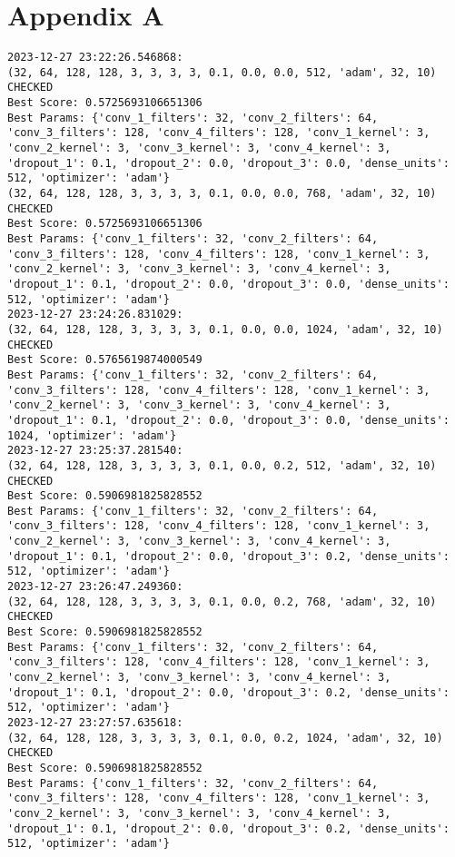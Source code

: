 \section*{Appendix A}
\begin{verbatim}
2023-12-27 23:22:26.546868:
(32, 64, 128, 128, 3, 3, 3, 3, 0.1, 0.0, 0.0, 512, 'adam', 32, 10) CHECKED
Best Score: 0.5725693106651306
Best Params: {'conv_1_filters': 32, 'conv_2_filters': 64, 'conv_3_filters': 128, 'conv_4_filters': 128, 'conv_1_kernel': 3, 'conv_2_kernel': 3, 'conv_3_kernel': 3, 'conv_4_kernel': 3, 'dropout_1': 0.1, 'dropout_2': 0.0, 'dropout_3': 0.0, 'dense_units': 512, 'optimizer': 'adam'}
(32, 64, 128, 128, 3, 3, 3, 3, 0.1, 0.0, 0.0, 768, 'adam', 32, 10) CHECKED
Best Score: 0.5725693106651306
Best Params: {'conv_1_filters': 32, 'conv_2_filters': 64, 'conv_3_filters': 128, 'conv_4_filters': 128, 'conv_1_kernel': 3, 'conv_2_kernel': 3, 'conv_3_kernel': 3, 'conv_4_kernel': 3, 'dropout_1': 0.1, 'dropout_2': 0.0, 'dropout_3': 0.0, 'dense_units': 512, 'optimizer': 'adam'}
2023-12-27 23:24:26.831029:
(32, 64, 128, 128, 3, 3, 3, 3, 0.1, 0.0, 0.0, 1024, 'adam', 32, 10) CHECKED
Best Score: 0.5765619874000549
Best Params: {'conv_1_filters': 32, 'conv_2_filters': 64, 'conv_3_filters': 128, 'conv_4_filters': 128, 'conv_1_kernel': 3, 'conv_2_kernel': 3, 'conv_3_kernel': 3, 'conv_4_kernel': 3, 'dropout_1': 0.1, 'dropout_2': 0.0, 'dropout_3': 0.0, 'dense_units': 1024, 'optimizer': 'adam'}
2023-12-27 23:25:37.281540:
(32, 64, 128, 128, 3, 3, 3, 3, 0.1, 0.0, 0.2, 512, 'adam', 32, 10) CHECKED
Best Score: 0.5906981825828552
Best Params: {'conv_1_filters': 32, 'conv_2_filters': 64, 'conv_3_filters': 128, 'conv_4_filters': 128, 'conv_1_kernel': 3, 'conv_2_kernel': 3, 'conv_3_kernel': 3, 'conv_4_kernel': 3, 'dropout_1': 0.1, 'dropout_2': 0.0, 'dropout_3': 0.2, 'dense_units': 512, 'optimizer': 'adam'}
2023-12-27 23:26:47.249360: 
(32, 64, 128, 128, 3, 3, 3, 3, 0.1, 0.0, 0.2, 768, 'adam', 32, 10) CHECKED
Best Score: 0.5906981825828552
Best Params: {'conv_1_filters': 32, 'conv_2_filters': 64, 'conv_3_filters': 128, 'conv_4_filters': 128, 'conv_1_kernel': 3, 'conv_2_kernel': 3, 'conv_3_kernel': 3, 'conv_4_kernel': 3, 'dropout_1': 0.1, 'dropout_2': 0.0, 'dropout_3': 0.2, 'dense_units': 512, 'optimizer': 'adam'}
2023-12-27 23:27:57.635618: 
(32, 64, 128, 128, 3, 3, 3, 3, 0.1, 0.0, 0.2, 1024, 'adam', 32, 10) CHECKED
Best Score: 0.5906981825828552
Best Params: {'conv_1_filters': 32, 'conv_2_filters': 64, 'conv_3_filters': 128, 'conv_4_filters': 128, 'conv_1_kernel': 3, 'conv_2_kernel': 3, 'conv_3_kernel': 3, 'conv_4_kernel': 3, 'dropout_1': 0.1, 'dropout_2': 0.0, 'dropout_3': 0.2, 'dense_units': 512, 'optimizer': 'adam'}

\end{verbatim}
